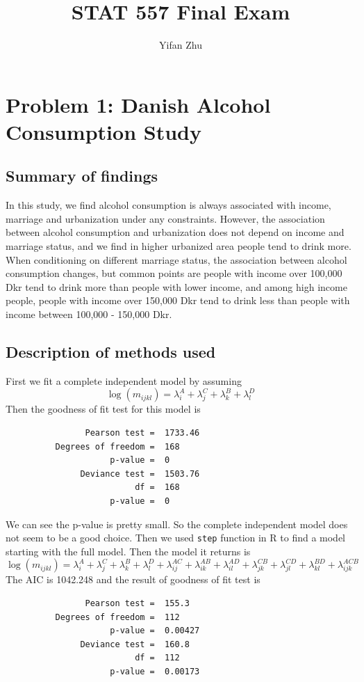 \documentclass{article}
\begin{document}
	


	
	\title{STAT 557 Final Exam}
	\author{Yifan Zhu}
	\maketitle
	
	\section{Problem 1: Danish Alcohol Consumption Study}
	\subsection{Summary of findings}
	In this study, we find alcohol consumption is always associated with income, marriage and urbanization under any constraints. However, the association between alcohol consumption and urbanization does not depend on income and marriage status, and we find in higher urbanized area people tend to drink more. When conditioning on different marriage status, the association between alcohol consumption changes, but common points are people with income over 100,000 Dkr tend to drink more than people with lower income, and among high income people, people with income over 150,000 Dkr tend to drink less than people with income between 100,000 - 150,000 Dkr.

	\subsection{Description of methods used}
	First we fit a complete independent model by assuming 
	\[\log(m_{ijkl}) = \lambda_{i}^A + \lambda^C_j + \lambda_{k}^B + \lambda^D_l\]
	Then the goodness of fit test for this model is
		\begin{verbatim}
                Pearson test =  1733.46
          Degrees of freedom =  168
                     p-value =  0
               Deviance test =  1503.76
                          df =  168
                     p-value =  0 
		\end{verbatim}

    We can see the p-value is pretty small. So the complete independent model does not seem to be a good choice. Then we used \verb|step| function in R to find a model starting with the full model. Then the model it returns is
    \[\log(m_{ijkl}) = \lambda_{i}^A + \lambda_{j}^C + \lambda_{k}^B + \lambda_{l}^D + \lambda_{ij}^{AC} + \lambda_{ik}^{AB} + \lambda_{il}^{AD} + \lambda_{jk}^{CB} + \lambda_{jl}^{CD} + \lambda_{kl}^{BD} + \lambda_{ijk}^{ACB}\]
    The AIC is 1042.248 and the result of goodness of fit test is
    \begin{verbatim}
                Pearson test =  155.3
          Degrees of freedom =  112
                     p-value =  0.00427
               Deviance test =  160.8
                          df =  112
                     p-value =  0.00173 
    \end{verbatim}
\end{document}
